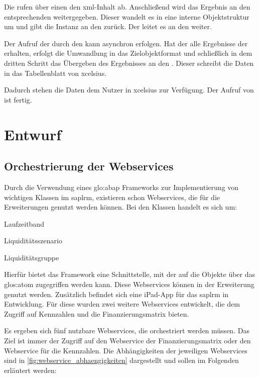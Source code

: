 \begin{onehalfspacing}
Die  rufen über einen  den \gls{xml}-Inhalt ab. Anschließend wird das Ergebnis an den entsprechenden  weitergegeben. Dieser wandelt es in eine interne Objektstruktur um und gibt die Instanz an den  zurück. Der  leitet es an den  weiter.

Der Aufruf der  durch den  kann asynchron erfolgen. Hat der  alle Ergebnisse der  erhalten, erfolgt die Umwandlung in das Zielobjektformat und schließlich in dem dritten Schritt das Übergeben des Ergebnisses an den . Dieser schreibt die Daten in das Tabellenblatt von \gls{xcelsius}.

Dadurch stehen die Daten dem Nutzer in \gls{xcelsius} zur Verfügung. Der Aufruf von  ist fertig.

\section{Entwurf}

\subsection{Orchestrierung der Webservices}
Durch die Verwendung eines \gls{glo:abap} Frameworks zur Implementierung von wichtigen Klassen im \gls{saplrm}, existieren schon Webservices, die für die Erweiterungen genutzt werden können. Bei den Klassen handelt es sich um:

\begin{seList}
\item Laufzeitband
\item Liquiditätsszenario
\item Liquiditätsgruppe
\end{seList}

Hierfür bietet das Framework eine Schnittstelle, mit der auf die Objekte über das \gls{glos:atom} zugegriffen werden kann. Diese Webservices können in der Erweiterung genutzt werden. Zusätzlich befindet sich eine iPad-App für das \gls{saplrm} in Entwicklung. Für diese wurden zwei weitere Webservices entwickelt, die dem Zugriff auf Kennzahlen und die Finanzierungsmatrix bieten.

Es ergeben sich fünf nutzbare Webservices, die orchestriert werden müssen. Das Ziel ist immer der Zugriff auf den Webservice der Finanzierungsmatrix oder den Webservice für die Kennzahlen. Die Abhängigkeiten der jeweiligen Webservices sind in \vref{fig:webservice_abhaengigkeiten} dargestellt und sollen im Folgenden erläutert werden:


\end{onehalfspacing}
